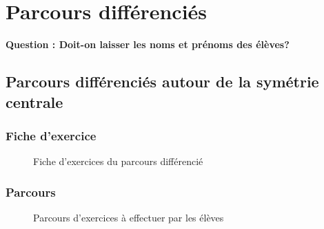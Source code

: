 \section{Parcours différenciés}
\textbf{\color{red}Question : Doit-on laisser les noms et prénoms des élèves?}
\subsection{Parcours différenciés autour de la symétrie centrale}
\subsubsection*{Fiche d'exercice}\label{parcours_symetrie_centrale}
\begin{figure}[!h]
	\caption{Fiche d'exercices du parcours différencié}
\end{figure}
\subsubsection*{Parcours}
\begin{figure}[!h]
	\caption{Parcours d'exercices à effectuer par les élèves}
\end{figure}
